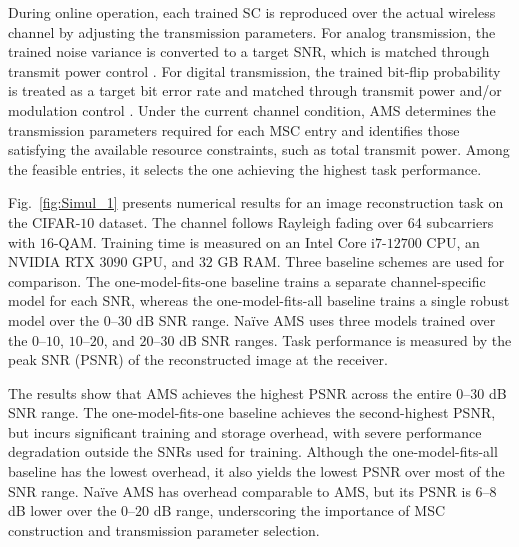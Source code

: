 \documentclass[10pt,twocolumn]{IEEEtran}
\begin{document}
During online operation, each trained SC is reproduced over the actual wireless channel by adjusting the transmission parameters. For analog transmission, the trained noise variance is converted to a target SNR, which is matched through transmit power control \cite{oh2026sfc}. For digital transmission, the trained bit-flip probability is treated as a target bit error rate and matched through transmit power and/or modulation control \cite{oh2025blindtraining}. Under the current channel condition, AMS determines the transmission parameters required for each MSC entry and identifies those satisfying the available resource constraints, such as total transmit power. Among the feasible entries, it selects the one achieving the highest task performance.


Fig.~\ref{fig:Simul_1} presents numerical results for an image reconstruction task on the CIFAR-$10$ dataset. The channel follows Rayleigh fading over 64 subcarriers with $16$-QAM. Training time is measured on an Intel Core i$7$-$12700$ CPU, an NVIDIA RTX $3090$ GPU, and $32$ GB RAM. Three baseline schemes are used for comparison. The one-model-fits-one baseline trains a separate channel-specific model for each SNR, whereas the one-model-fits-all baseline trains a single robust model over the $0$--$30$ dB SNR range. Na\"ive AMS uses three models trained over the $0$--$10$, $10$--$20$, and $20$--$30$ dB SNR ranges. Task performance is measured by the peak SNR (PSNR) of the reconstructed image at the receiver.




The results show that AMS achieves the highest PSNR across the entire $0$--$30$ dB SNR range. The one-model-fits-one baseline achieves the second-highest PSNR, but incurs significant training and storage overhead, with severe performance degradation outside the SNRs used for training. Although the one-model-fits-all baseline has the lowest overhead, it also yields the lowest PSNR over most of the SNR range. Na\"ive AMS has overhead comparable to AMS, but its PSNR is $6$--$8$ dB lower over the $0$--$20$ dB range, underscoring the importance of MSC construction and transmission parameter selection.


\end{document}
